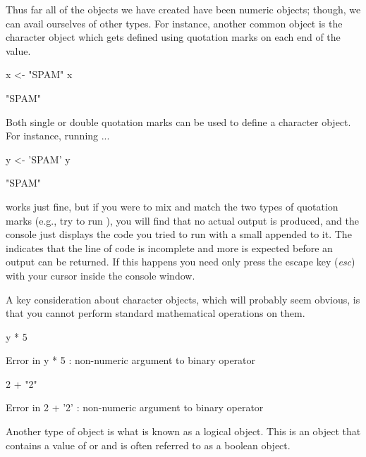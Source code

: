 Thus far all of the objects we have created have been \gls{numeric} objects; though, we can avail ourselves of other types.  For instance, another common object is the \gls{character} object which gets defined using quotation marks on each end of the value.

\begin{inR}
x <- "SPAM"
x
\end{inR}

\begin{outR}
[1] "SPAM"
\end{outR}

\noindent
Both single or double quotation marks can be used to define a character object. For instance, running ...

\begin{inR}
y <- 'SPAM'
y
\end{inR}

\begin{outR}
[1] "SPAM"
\end{outR}

\noindent
works just fine, but if you were to mix and match the two types of quotation marks (e.g., try to run ), you will find that no actual output is produced, and the console just displays the code you tried to run with a small \R{+} appended to it. The \R{+} indicates that the line of code is incomplete and more is expected before an output can be returned. If this happens you need only press the escape key (\textit{esc}) with your cursor inside the console window.

A key consideration about character objects, which will probably seem obvious, is that you cannot perform standard mathematical operations on them.

\begin{inR}
y * 5
\end{inR}

\begin{outR}
Error in y * 5 : non-numeric argument to binary operator
\end{outR}

\begin{inR}
2 + "2"
\end{inR}

\begin{outR}
Error in 2 + '2' : non-numeric argument to binary operator
\end{outR}

Another type of object is what is known as a \gls{logical} object.  This is an object that contains a value of  or  and is often referred to as a \gls{boolean} object.

